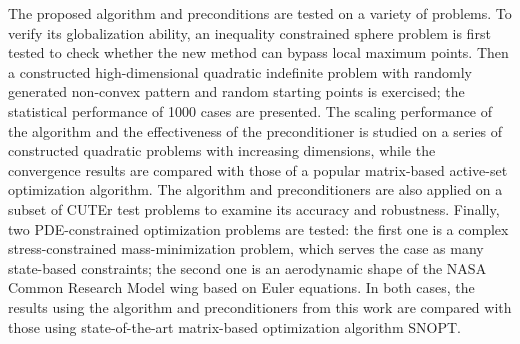 The proposed algorithm and preconditions are tested on a variety of problems. To verify its globalization ability, an inequality constrained sphere problem is first tested to check whether the new method can bypass local maximum points. Then a constructed high-dimensional quadratic indefinite problem with randomly generated non-convex pattern and random starting points is exercised; the statistical performance of 1000 cases are presented. The scaling performance of the algorithm and the effectiveness of the preconditioner is studied on a series of constructed quadratic problems with increasing dimensions, while the convergence results are compared with those of a popular matrix-based active-set optimization algorithm. The algorithm and preconditioners are also applied on a subset of CUTEr test problems to examine its accuracy and robustness. Finally, two PDE-constrained optimization problems are tested: the first one is a complex stress-constrained mass-minimization problem, which serves the case as many state-based constraints; the second one is an aerodynamic shape of the NASA Common Research Model wing based on Euler equations. In both cases, the results using the algorithm and preconditioners from this work are compared with those using state-of-the-art matrix-based optimization algorithm SNOPT. 


